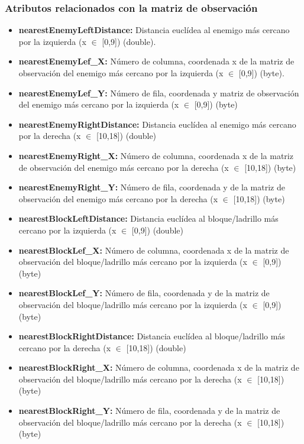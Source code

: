 \documentclass[10pt, spanish, pdftex]{../.template/template}
\begin{document}
{    \subsubsection{Atributos relacionados con la matriz de observación}
    \begin{itemize}
        \item \textbf{nearestEnemyLeftDistance:} Distancia euclídea al enemigo más cercano por la izquierda (x $\in$ [0,9]) (double).
        \item \textbf{nearestEnemyLef\_X:} Número de columna, coordenada x de la matriz de observación del enemigo más cercano por la izquierda (x $\in$ [0,9]) (byte).
        \item \textbf{nearestEnemyLef\_Y:} Número de fila, coordenada y matriz de observación del enemigo más cercano por la izquierda (x $\in$ [0,9]) (byte)
        \item \textbf{nearestEnemyRightDistance:} Distancia euclídea al enemigo más cercano por la derecha (x $\in$ [10,18]) (double)
        \item \textbf{nearestEnemyRight\_X:} Número de columna, coordenada x de la matriz de observación del enemigo más cercano por la derecha (x $\in$ [10,18]) (byte)
        \item \textbf{nearestEnemyRight\_Y:} Número de fila, coordenada y de la matriz de observación del enemigo más cercano por la derecha (x $\in$ [10,18]) (byte)
        \item \textbf{nearestBlockLeftDistance:} Distancia euclídea al bloque/ladrillo más cercano por la izquierda (x $\in$ [0,9]) (double)
        \item \textbf{nearestBlockLef\_X:} Número de columna, coordenada x de la matriz de observación del bloque/ladrillo más cercano por la izquierda (x $\in$ [0,9]) (byte)
        \item \textbf{nearestBlockLef\_Y:} Número de fila, coordenada y de la matriz de observación del bloque/ladrillo más cercano por la izquierda (x $\in$ [0,9]) (byte)
        \item \textbf{nearestBlockRightDistance:} Distancia euclídea al bloque/ladrillo más cercano por la derecha (x $\in$ [10,18]) (double)
        \item \textbf{nearestBlockRight\_X:} Número de columna, coordenada x de la matriz de observación del bloque/ladrillo más cercano por la derecha (x $\in$ [10,18]) (byte)
        \item \textbf{nearestBlockRight\_Y:} Número de fila, coordenada y de la matriz de observación del bloque/ladrillo más cercano por la derecha (x $\in$ [10,18]) (byte)

\end{itemize}}
\end{document}
